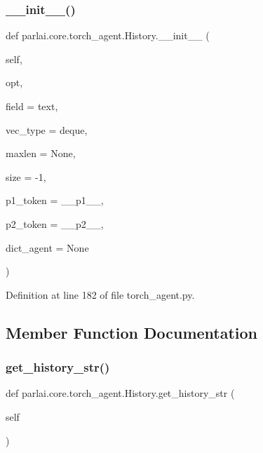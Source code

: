 \subsubsection{\texorpdfstring{\+\_\+\+\_\+init\+\_\+\+\_\+()}{\_\_init\_\_()}}
{\footnotesize\ttfamily def parlai.\+core.\+torch\+\_\+agent.\+History.\+\_\+\+\_\+init\+\_\+\+\_\+ (\begin{DoxyParamCaption}\item[{}]{self,  }\item[{}]{opt,  }\item[{}]{field = {\ttfamily \textquotesingle{}text\textquotesingle{}},  }\item[{}]{vec\+\_\+type = {\ttfamily \textquotesingle{}deque\textquotesingle{}},  }\item[{}]{maxlen = {\ttfamily None},  }\item[{}]{size = {\ttfamily -\/1},  }\item[{}]{p1\+\_\+token = {\ttfamily \textquotesingle{}\+\_\+\+\_\+p1\+\_\+\+\_\+\textquotesingle{}},  }\item[{}]{p2\+\_\+token = {\ttfamily \textquotesingle{}\+\_\+\+\_\+p2\+\_\+\+\_\+\textquotesingle{}},  }\item[{}]{dict\+\_\+agent = {\ttfamily None} }\end{DoxyParamCaption})}



Definition at line 182 of file torch\+\_\+agent.\+py.



\subsection{Member Function Documentation}
\mbox{\label{classparlai_1_1core_1_1torch__agent_1_1History_a29576ee0dd27b8ee5e651297dada3131}} 
\subsubsection{\texorpdfstring{get\+\_\+history\+\_\+str()}{get\_history\_str()}}
{\footnotesize\ttfamily def parlai.\+core.\+torch\+\_\+agent.\+History.\+get\+\_\+history\+\_\+str (\begin{DoxyParamCaption}\item[{}]{self }\end{DoxyParamCaption})}

